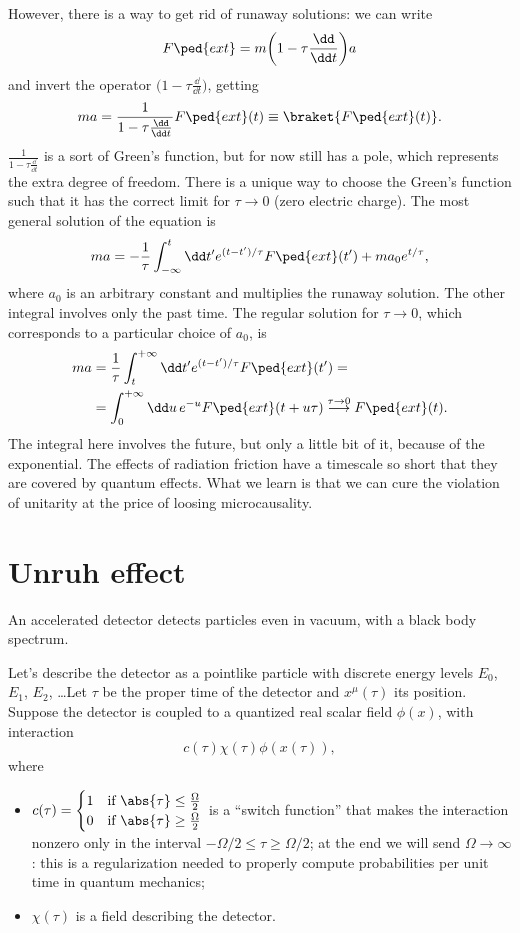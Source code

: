 \documentclass[a4paper,12pt]{book}
\begin{document}
However, there is a way to get rid of runaway solutions: we can write
\[F\ped{ext}=m\biggl(1-\tau\frac{\dd}{\dd t}\biggr)a\]
and invert the operator $\bigl(1-\tau\frac{\dd}{\dd t}\bigr)$, getting
\[ma=\frac1{1-\tau\frac{\dd}{\dd t}}F\ped{ext}(t)\equiv \braket{F\ped{ext}(t)}.\]
$\frac1{1-\tau\frac{\dd}{\dd t}}$ is a sort of Green's function, but for now still has a pole, which represents the extra degree of freedom. There is a unique way to choose the Green's function such that it has the correct limit for $\tau\to0$ (zero electric charge). The most general solution of the equation is
\[ma=-\frac1\tau\int_{-\infty}^t\dd t'e^{(t-t')/\tau}F\ped{ext}(t')+ma_0e^{t/\tau},\]
where $a_0$ is an arbitrary constant and multiplies the runaway solution. The other integral involves only the past time. The regular solution for $\tau\to0$, which corresponds to a particular choice of $a_0$, is
\begin{align*}
ma&=\frac1\tau\int_t^{+\infty}\dd t'e^{(t-t')/\tau}F\ped{ext}(t')=\\
&=\int_0^{+\infty}\dd u\,e^{-u}F\ped{ext}(t+u\tau)\overset{\tau\to0}{\longrightarrow}F\ped{ext}(t)
.
\end{align*}
The integral here involves the future, but only a little bit of it, because of the exponential. The effects of radiation friction have a timescale so short that they are covered by quantum effects. What we learn is that we can cure the violation of unitarity at the price of loosing microcausality.

\section{Unruh effect}
An accelerated detector detects particles even in vacuum, with a black body spectrum.

Let's describe the detector as a pointlike particle with discrete energy levels $E_0$, $E_1$, $E_2$, \ldots Let $\tau$ be the proper time of the detector and $x^\mu(\tau)$ its position. Suppose the detector is coupled to a quantized real scalar field $\phi(x)$, with interaction
\[c(\tau)\chi(\tau)\phi(x(\tau)),\]
where
\begin{itemize}
\item $c(\tau)=\begin{cases}1&\text{if }\abs{\tau}\le\frac\Omega2\\ 0&\text{if }\abs{\tau}\ge\frac\Omega2\end{cases}$ is a ``switch function'' that makes the interaction nonzero only in the interval $-\Omega/2\le\tau\ge\Omega/2$; at the end we will send $\Omega\to\infty$: this is a regularization needed to properly compute probabilities per unit time in quantum mechanics;
\item $\chi(\tau)$ is a field describing the detector.
\end{itemize}
\end{document}
